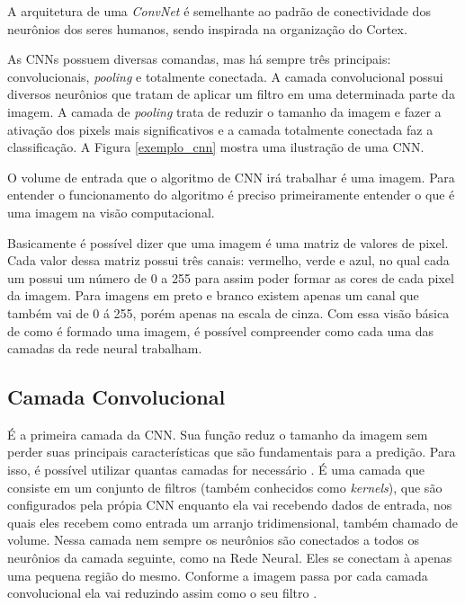 A arquitetura de uma \textit{ConvNet} é semelhante ao padrão de conectividade dos neurônios dos seres humanos, sendo inspirada na organização do Cortex. \cite{conv1}

 As CNNs possuem diversas comandas, mas há sempre três principais: convolucionais, \textit{pooling} e totalmente conectada. A camada convolucional possui diversos neurônios que tratam de aplicar um filtro em uma determinada parte da imagem. A camada de \textit{pooling} trata de reduzir o tamanho da imagem e fazer a ativação dos pixels mais significativos e a camada totalmente conectada faz a classificação. A Figura \ref{exemplo_cnn} mostra uma ilustração de uma CNN.

\begin{figure}[H]
	\centering
\end{figure}

O volume de entrada que o algoritmo de CNN irá trabalhar é uma imagem. Para entender o funcionamento do algoritmo é preciso primeiramente entender o que é uma imagem na visão computacional\cite{conv2}. 

Basicamente é possível dizer que uma imagem é uma matriz de valores de pixel. Cada valor dessa matriz possui três canais: vermelho, verde e azul, no qual cada um possui um número de 0 a 255 para assim poder formar as cores de cada pixel da imagem. Para imagens em preto e branco existem apenas um canal que também vai de 0 á 255, porém apenas na escala de cinza. 
Com essa visão básica de como é formado uma imagem, é possível compreender como cada uma das camadas da rede neural trabalham.

\subsection{Camada Convolucional}

É a primeira camada da CNN. Sua função reduz o tamanho da imagem sem perder suas principais características que são fundamentais para a predição. Para isso, é possível utilizar quantas camadas for necessário \cite{freecodecamp}. É uma camada que consiste em um conjunto de filtros (também conhecidos como \textit{kernels}), que são configurados pela própia CNN enquanto ela vai recebendo dados de entrada, nos quais eles recebem como entrada um arranjo tridimensional, também chamado de volume. Nessa camada nem sempre os neurônios são conectados a todos os neurônios da camada seguinte, como na Rede Neural. Eles se conectam à apenas uma pequena região do mesmo. Conforme a imagem passa por cada camada convolucional ela vai reduzindo assim como o seu filtro \cite{freecodecamp, conv2}.
 

